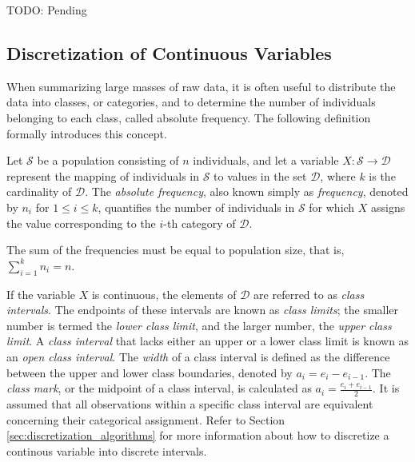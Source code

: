 {\color{red} TODO: Pending}


\subsection{Discretization of Continuous Variables}
\label{subsec:discretization_continuous_variables}

When summarizing large masses of raw data, it is often useful to distribute the data into classes, or categories, and to determine the number of individuals belonging to each class, called absolute frequency. The following definition formally introduces this concept.

\begin{definition}
Let $\mathcal{S}$ be a population consisting of $n$ individuals, and let a variable $X: \mathcal{S} \rightarrow \mathcal{D}$ represent the mapping of individuals in $\mathcal{S}$ to values in the set $\mathcal{D}$, where $k$ is the cardinality of $\mathcal{D}$. The \emph{absolute frequency}, also known simply as \emph{frequency}, denoted by $n_i$ for $1 \leq i \leq k$, quantifies the number of individuals in $\mathcal{S}$ for which $X$ assigns the value corresponding to the $i$-th category of $\mathcal{D}$.
\end{definition}

The sum of the frequencies must be equal to population size, that is, $\sum_{i=1}^k n_i = n$.

If the variable $X$ is continuous, the elements of $\mathcal{D}$ are referred to as \emph{class intervals}. The endpoints of these intervals are known as \emph{class limits}; the smaller number is termed the \emph{lower class limit}, and the larger number, the \emph{upper class limit}. A \emph{class interval} that lacks either an upper or a lower class limit is known as an \emph{open class interval}. The \emph{width} of a class interval is defined as the difference between the upper and lower class boundaries, denoted by $a_i = e_i - e_{i-1}$. The \emph{class mark}, or the midpoint of a class interval, is calculated as $a_i = \frac{e_i + e_{i-1}}{2}$. It is assumed that all observations within a specific class interval are equivalent concerning their categorical assignment. Refer to Section \ref{sec:discretization_algorithms} for more information about how to discretize a continous variable into discrete intervals.

